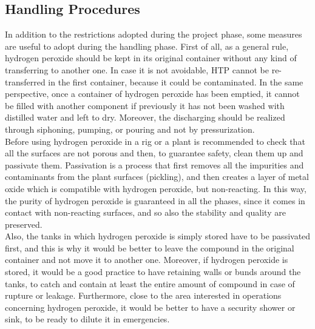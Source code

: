 \documentclass[a4paper]{report}
\begin{document}
\subsection{Handling Procedures}

In addition to the restrictions adopted during the project phase, some measures are useful to adopt during the handling phase. First of all, as a general rule, hydrogen peroxide should be kept in its original container without any kind of transferring to another one. In case it is not avoidable, HTP cannot be re-transferred in the first container, because it could be contaminated. In the same perspective, once a container of hydrogen peroxide has been emptied, it cannot be filled with another component if previously it has not been washed with distilled water and left to dry. Moreover, the discharging should be realized through siphoning, pumping, or pouring and not by pressurization.\\
Before using hydrogen peroxide in a rig or a plant is recommended to check that all the surfaces are not porous and then, to guarantee safety, clean them up and passivate them. Passivation is a process that first removes all the impurities and contaminants from the plant surfaces (pickling), and then creates a layer of metal oxide which is compatible with hydrogen peroxide, but non-reacting. In this way, the purity of hydrogen peroxide is guaranteed in all the phases, since it comes in contact with non-reacting surfaces, and so also the stability and quality are preserved. \\
Also, the tanks in which hydrogen peroxide is simply stored have to be passivated first, and this is why it would be better to leave the compound in the original container and not move it to another one. Moreover, if hydrogen peroxide is stored, it would be a good practice to have retaining walls or bunds around the tanks, to catch and contain at least the entire amount of compound in case of rupture or leakage. Furthermore, close to the area interested in operations concerning hydrogen peroxide, it would be better to have a security shower or sink, to be ready to dilute it in emergencies. \\
\end{document}
